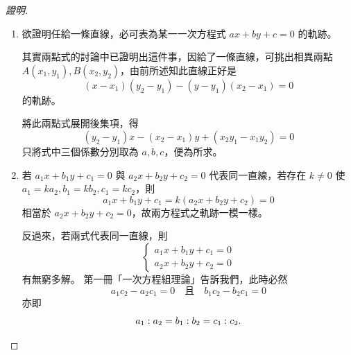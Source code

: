 \begin{proof}[證明]
\begin{enumerate}[label=(\Roman*), leftmargin=2em]
  反過來 $ax + by + c = 0$ 上的點，也一定要在 $L$ 上。道理是這樣：
  若 $P(x, y)$ 滿足 $ax + by + c = 0$，則由 \eqref{eq:b3-4-13} 式可得
  \begin{align*}
  -a(x - x_1) &= b(y - y_1) \\
  -b(y_2 - y_1) &= a(x_2 - x_1)
  \end{align*}
  故當 $a \neq 0$ 時，上兩式相乘，移項得
  \[ (x - x_1)(y_2 - y_1) - (y - y_1)(x_2 - x_1) = 0 \]
  由兩點式中的討論知 $P(x, y)$ 就在 $L$ 上。
  
  如果 $a = 0$，則 $y = -\frac{c}{b}$，而由 \eqref{eq:b3-4-13} 式 $y_1, y_2$ 亦皆等於 $-\frac{c}{b}$，$L$ 為 $y$ 座標等於 $-\frac{c}{b}$ 而平行於 $X$ 軸的直線，故 $P(x, -\frac{c}{b})$ 即在 $L$ 上，見圖 \ref{fig:4-23}。
  
  \begin{figure}[H]
  \centering
  \caption{$a=0$ 時平行於 $X$ 軸之直線}
  \label{fig:4-23}
  \end{figure}
  
  \item 欲證明任給一條直線，必可表為某一一次方程式 $ax + by + c = 0$ 的軌跡。
  
  其實兩點式的討論中已證明出這件事，因給了一條直線，可挑出相異兩點 $A(x_1, y_1), B(x_2, y_2)$，由前所述知此直線正好是
  \[ (x - x_1)(y_2 - y_1) - (y - y_1)(x_2 - x_1) = 0 \]
  的軌跡。
  
  將此兩點式展開後集項，得
  \[ (y_2 - y_1)x - (x_2 - x_1)y + (x_2 y_1 - x_1 y_2) = 0 \]
  只將式中三個係數分別取為 $a, b, c$，便為所求。
  
  \item 若 $a_1 x + b_1 y + c_1 = 0$ 與 $a_2 x + b_2 y + c_2 = 0$ 代表同一直線，若存在 $k \neq 0$ 使 $a_1 = k a_2, b_1 = k b_2, c_1 = k c_2$，則
  \[ a_1 x + b_1 y + c_1 = k(a_2 x + b_2 y + c_2) = 0 \]
  相當於 $a_2 x + b_2 y + c_2 = 0$，故兩方程式之軌跡一模一樣。
  
  反過來，若兩式代表同一直線，則
  \[ \begin{cases} a_1 x + b_1 y + c_1 = 0 \\ a_2 x + b_2 y + c_2 = 0 \end{cases} \]
  有無窮多解。
  第一冊「一次方程組理論」告訴我們，此時必然
  \[ a_1 c_2 - a_2 c_1 = 0 \quad\text{且}\quad b_1 c_2 - b_2 c_1 = 0 \]
  亦即
  \[ a_1 : a_2 = b_1 : b_2 = c_1 : c_2. \qedhere \]
\end{enumerate}
\end{proof}

